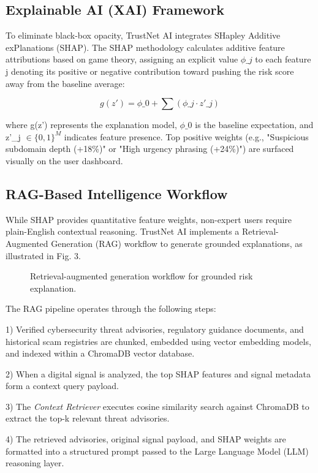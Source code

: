 \documentclass[conference,a4paper]{IEEEtran}
\begin{document}
\subsection{Explainable AI (XAI) Framework}
To eliminate black-box opacity, TrustNet AI integrates SHapley Additive exPlanations (SHAP). The SHAP methodology calculates additive feature attributions based on game theory, assigning an explicit value $\phi\_j$ to each feature j denoting its positive or negative contribution toward pushing the risk score away from the baseline average:

\begin{equation}
g(z') = \phi\_0 + \sum (\phi\_j \cdot z'\_j)
\end{equation}

where g(z') represents the explanation model, $\phi\_0$ is the baseline expectation, and z'\_j $\in \{0,1\}^M$ indicates feature presence. Top positive weights (e.g., "Suspicious subdomain depth (+18\%)" or "High urgency phrasing (+24\%)") are surfaced visually on the user dashboard.

\subsection{RAG-Based Intelligence Workflow}
While SHAP provides quantitative feature weights, non-expert users require plain-English contextual reasoning. TrustNet AI implements a Retrieval-Augmented Generation (RAG) workflow to generate grounded explanations, as illustrated in Fig. 3.

\begin{figure}[h]
\centering
\fbox{\rule{0pt}{1.5in} \rule{0.9\linewidth}{0pt}}
\caption{Retrieval-augmented generation workflow for grounded risk explanation.}
\end{figure}

The RAG pipeline operates through the following steps:

1) Verified cybersecurity threat advisories, regulatory guidance documents, and historical scam registries are chunked, embedded using vector embedding models, and indexed within a ChromaDB vector database.

2) When a digital signal is analyzed, the top SHAP features and signal metadata form a context query payload.

3) The \textit{Context Retriever} executes cosine similarity search against ChromaDB to extract the top-k relevant threat advisories.

4) The retrieved advisories, original signal payload, and SHAP weights are formatted into a structured prompt passed to the Large Language Model (LLM) reasoning layer.
\end{document}
